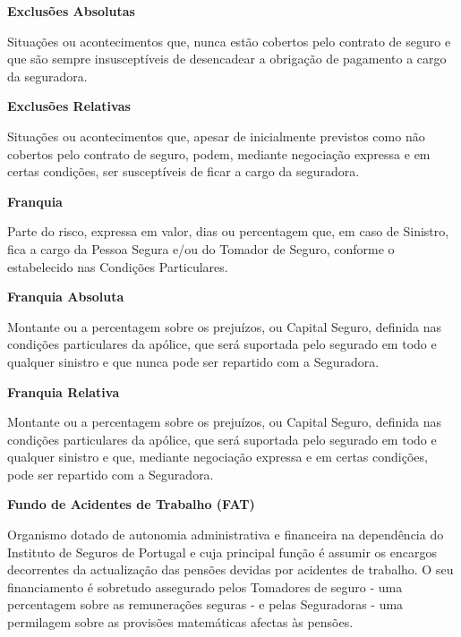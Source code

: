 \begin{description}
\item \textbf{Exclusões Absolutas}

Situações ou acontecimentos que, nunca estão cobertos pelo contrato de seguro e que são sempre insusceptíveis de desencadear a obrigação de pagamento a cargo da seguradora.
\end{description}

\begin{description}
\item \textbf{Exclusões Relativas}

Situações ou acontecimentos que, apesar de inicialmente previstos como não cobertos pelo contrato de seguro, podem, mediante negociação expressa e em certas condições, ser susceptíveis de ficar a cargo da seguradora.
\end{description}

\begin{description}
\item \textbf{Franquia}

Parte do risco, expressa em valor, dias ou percentagem que, em caso de Sinistro, fica a cargo da Pessoa Segura e/ou do Tomador de Seguro, conforme o estabelecido nas Condições Particulares.
\end{description}

\begin{description}
\item \textbf{Franquia Absoluta}

Montante ou a percentagem sobre os prejuízos, ou Capital Seguro, definida nas condições particulares da apólice, que será suportada pelo segurado em todo e qualquer sinistro e que nunca pode ser repartido com a Seguradora.
\end{description}

\begin{description}
\item \textbf{Franquia Relativa}

Montante ou a percentagem sobre os prejuízos, ou Capital Seguro, definida nas condições particulares da apólice, que será suportada pelo segurado em todo e qualquer sinistro e que, mediante negociação expressa e em certas condições, pode ser repartido com a Seguradora.
\end{description}

\begin{description}
\item \textbf{Fundo de Acidentes de Trabalho (FAT)}

Organismo dotado de autonomia administrativa e financeira na dependência do Instituto de Seguros de Portugal e cuja principal função é assumir os encargos decorrentes da actualização das pensões devidas por acidentes de trabalho. O seu financiamento é sobretudo assegurado pelos Tomadores de seguro - uma percentagem sobre as remunerações seguras - e pelas Seguradoras - uma permilagem sobre as provisões matemáticas afectas às pensões.
\end{description}

